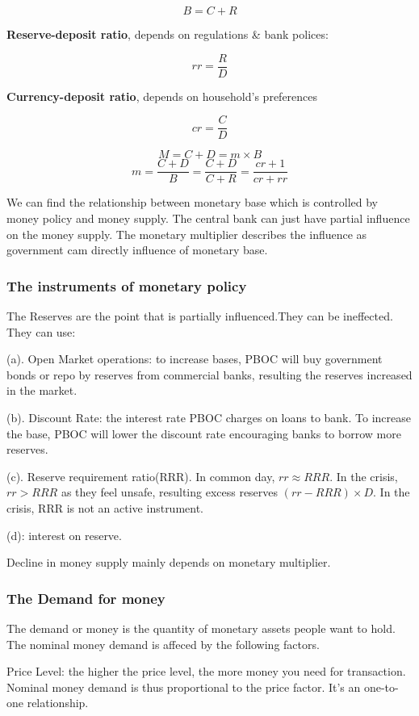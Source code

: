 \documentclass[10pt, a4paper]{article}
\begin{document}
                $$B = C + R$$

                \textbf{Reserve-deposit ratio}, depends on regulations \& bank polices:
            
                $$rr = \frac{R}{D}$$

                \textbf{Currency-deposit ratio}, depends on household's preferences 

                $$cr = \frac{C}{D}$$

                $$M = C + D = m \times B$$
                $$m = \frac{C + D}{B} = \frac{C + D}{C + R} = \frac{cr + 1}{cr + rr}$$

                We can find the relationship between monetary base which is controlled by money policy and money supply. The central bank can just have partial influence on the money supply. The monetary multiplier describes the influence as government cam directly influence of monetary base. 
    \subsubsection{The instruments of monetary policy}
        The Reserves are the point that is partially influenced.They can be ineffected. They can use:
        
        (a). Open Market operations: to increase bases, PBOC will buy government bonds or repo by reserves from commercial banks, resulting the reserves increased in the market. 
        
        (b). Discount Rate: the interest rate PBOC charges on loans to bank. To increase the base, PBOC will lower the discount rate encouraging banks to borrow more reserves. 

        (c). Reserve requirement ratio(RRR). In common day, $rr \approx RRR$. In the crisis, $rr > RRR$ as they feel unsafe, resulting excess reserves $(rr - RRR) \times D$. In the crisis, RRR is not an active instrument.
        
        (d): interest on reserve.

        Decline in money supply mainly depends on monetary multiplier.
    \subsubsection{The Demand for money}
        The demand or money is the quantity of monetary assets people want to hold. The nominal money demand is affeced by the following factors. 

        Price Level: the higher the price level, the more money you need for transaction. Nominal money  demand is thus proportional to the price factor. It's an one-to-one relationship. 
\end{document}
